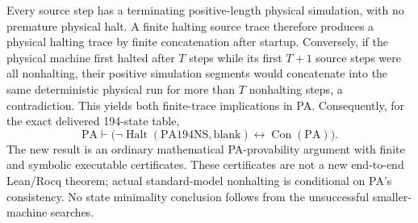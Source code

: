 Every source step has a terminating positive-length physical simulation,
with no premature physical halt. A finite halting source trace therefore
produces a physical halting trace by finite concatenation after startup.
Conversely, if the physical machine first halted after $T$ steps while
its first $T+1$ source steps were all nonhalting, their positive simulation
segments would concatenate into the same deterministic physical run for
more than $T$ nonhalting steps, a contradiction. This yields both
finite-trace implications in PA. Consequently, for the exact delivered
194-state table,
\[
 \boxed{\mathrm{PA}\vdash
 \bigl(\neg\operatorname{Halt}(\mathrm{PA194NS},\mathrm{blank})
                    \leftrightarrow\operatorname{Con}(\mathrm{PA})\bigr).}
\]
The new result is an ordinary mathematical PA-provability argument with
finite and symbolic executable certificates. These certificates are not
a new end-to-end Lean/Rocq theorem; actual standard-model nonhalting is
conditional on PA's consistency. No state minimality conclusion follows
from the unsuccessful smaller-machine searches.
